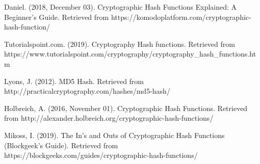 \documentclass{article}
\begin{document}
\newpage
\begin{thebibliography}{}
	Daniel. (2018, December 03). Cryptographic Hash Functions Explained: A Beginner's Guide. Retrieved from {https://komodoplatform.com/cryptographic-hash-function/}
	
	Tutorialspoint.com. (2019). Cryptography Hash functions. Retrieved from https://www.tutorialspoint.com/cryptography/cryptography\_hash\_functions.htm
	
	Lyons, J. (2012). MD5 Hash. Retrieved from {http://practicalcryptography.com/hashes/md5-hash/}
	
	Holbreich, A. (2016, November 01). Cryptographic Hash Functions. Retrieved from {http://alexander.holbreich.org/cryptographic-hash-functions/}	
	
	Mikoss, I. (2019). The In's and Outs of Cryptographic Hash Functions (Blockgeek's Guide).
	Retrieved from {https://blockgeeks.com/guides/cryptographic-hash-functions/}
\end{thebibliography}
\end{document}
